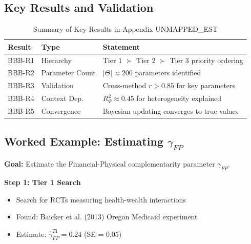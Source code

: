 \subsection{Key Results and Validation}
\label{sec:BBB-results}

\begin{table}[htbp]
\centering
\caption{Summary of Key Results in Appendix UNMAPPED_EST}
\label{tab:bbb-results}
\renewcommand{\arraystretch}{1.2}
\begin{tabular}{@{}llp{6cm}@{}}
\toprule
\textbf{Result} & \textbf{Type} & \textbf{Statement} \\
\midrule
BBB-R1 & Hierarchy & Tier 1 $\succ$ Tier 2 $\succ$ Tier 3 priority ordering \\
BBB-R2 & Parameter Count & $|\Theta| \approx 200$ parameters identified \\
BBB-R3 & Validation & Cross-method $r > 0.85$ for key parameters \\
BBB-R4 & Context Dep. & $R^2_\Psi \approx 0.45$ for heterogeneity explained \\
BBB-R5 & Convergence & Bayesian updating converges to true values \\
\bottomrule
\end{tabular}
\end{table}


\subsection{Worked Example: Estimating $\gamma_{FP}$}
\label{sec:BBB-example}

\textbf{Goal:} Estimate the Financial-Physical complementarity parameter $\gamma_{FP}$.

\textbf{Step 1: Tier 1 Search}
\begin{itemize}[nosep]
    \item Search for RCTs measuring health-wealth interactions
    \item Found: Baicker et al. (2013) Oregon Medicaid experiment
    \item Estimate: $\hat{\gamma}_{FP}^{T1} = 0.24$ (SE = 0.05)
\end{itemize}

